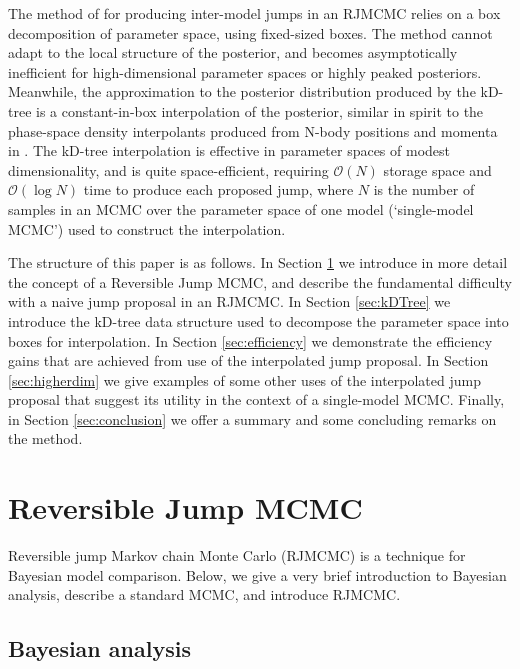 \documentclass{iopart}
\newcommand{\order}[1]{\mathcal{O}\left( #1 \right)}
\begin{document}
The method of \cite{Littenberg2009} for producing inter-model jumps in
an RJMCMC relies on a box decomposition of parameter space, using
fixed-sized boxes.  The method cannot adapt to the local structure of
the posterior, and becomes asymptotically inefficient for
high-dimensional parameter spaces or highly peaked posteriors.
Meanwhile, the approximation to the posterior distribution produced by
the kD-tree is a constant-in-box interpolation of the posterior,
similar in spirit to the phase-space density interpolants produced
from N-body positions and momenta in \cite{Ascasibar2005}.  The
kD-tree interpolation is effective in parameter spaces of modest
dimensionality, and is quite space-efficient, requiring $\order{N}$
storage space and $\order{\log N}$ time to produce each proposed jump,
where $N$ is the number of samples in an MCMC over the parameter space of one model (`single-model MCMC') used to construct the interpolation.

The structure of this paper is as follows.  In Section
\ref{sec:reversible-jump} we introduce in more detail the concept of a
Reversible Jump MCMC, and describe the fundamental difficulty with a
naive jump proposal in an RJMCMC.  In Section \ref{sec:kDTree} we
introduce the kD-tree data structure used to decompose the parameter
space into boxes for interpolation.  In Section \ref{sec:efficiency}
we demonstrate the efficiency gains that are achieved from use of the
interpolated jump proposal.  In Section \ref{sec:higherdim} we give
examples of some other uses of the interpolated jump proposal that
suggest its utility in the context of a single-model MCMC.  Finally,
in Section \ref{sec:conclusion} we offer a summary and some concluding
remarks on the method.

\section{Reversible Jump MCMC}
\label{sec:reversible-jump}

Reversible jump Markov chain Monte Carlo (RJMCMC) \cite{Green1995} is
a technique for Bayesian model comparison.  Below, we give a very
brief introduction to Bayesian analysis, describe a standard MCMC, and
introduce RJMCMC.

\subsection{Bayesian analysis}
\end{document}

